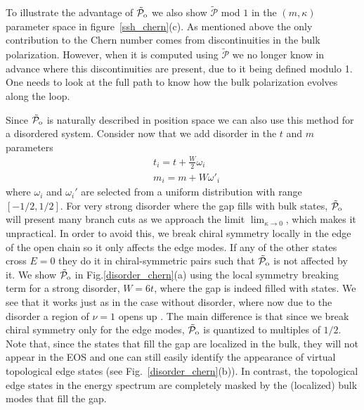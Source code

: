 \documentclass[twocolumn,amsmath,longbibliography,amssymb,superscriptaddress]{revtex4-1}
\newcommand{\tpo}{\tilde{\mathcal{P}}_{\rm o}}
\begin{document}
To illustrate the advantage of $\tpo$ we also show $\tilde{\mathcal{P}}$ mod $1$ in the $(m,\kappa)$ parameter space in figure~\ref{ssh_chern}(c). As mentioned above the only contribution to the Chern number comes from discontinuities in the bulk polarization.
However, when it is computed using $\tilde{\mathcal{P}}$ we no longer know in advance where this discontinuities are present, due to it being defined modulo 1. One needs to look at the full path to know how the bulk polarization evolves along the loop. 

Since $\tpo$ is naturally described in position space we can also use this method for a disordered system. Consider now that we add disorder in the $t$ and $m$ parameters
\begin{align}
&t_i = t + \frac{W}{2} \omega_i \nonumber\\
&m_i = m + W \omega'_i
\end{align}
where $\omega_i$ and $\omega_i'$ are selected from a uniform distribution with range $[-1/2,1/2]$. For very strong disorder where the gap fills with bulk states, $\tpo$ will present many branch cuts as we approach the limit $\lim_{\kappa \rightarrow 0}$, which makes it unpractical. In order to avoid this, we break chiral symmetry locally in the edge of the open chain so it only affects the edge modes. If any of the other states cross $E=0$ they do it in  chiral-symmetric pairs such that $\tpo$ is not affected by it. We show $\tpo$ in Fig.\ref{disorder_chern}(a) using the local symmetry breaking term for a strong disorder, $W=6t$, where the gap is indeed filled with states. We see that it works just as in the case without disorder, where now due to the disorder a region of $\nu=1$ opens up \cite{Song2014}. The main difference is that since we break chiral symmetry only for the edge modes, $\tpo$ is quantized to multiples of $1/2$. Note that, since the states that fill the gap are localized in the bulk, they will not appear in the EOS and one can still easily identify the appearance of virtual topological edge states (see Fig.~\ref{disorder_chern}(b)).
In contrast, the topological edge states in the energy spectrum are completely masked by the (localized) bulk modes that fill the gap.
\end{document}
